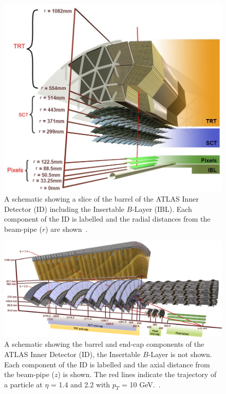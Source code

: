 \begin{figure}[!ht]
  \begin{center}
    \includegraphics[width=0.8\linewidth, angle=0]{figs/Detector/ID_slice.png}
  \end{center}
  \caption[A schematic showing a slice of the barrel of the ATLAS Inner Detector including the Insertable $B$-Layer.]
          {A schematic showing a slice of the barrel of the ATLAS Inner Detector (ID) including the Insertable $B$-Layer (IBL).
            Each component of the ID is labelled and the radial distances from the beam-pipe ($r$) are shown~\cite{obj-tracks_TIDE}.}
  \label{fig:det-ID_slice}
\end{figure}

\begin{figure}[!ht]
  \begin{center}
    \includegraphics[width=1\linewidth, angle=0]{figs/Detector/ID_schem.pdf}
  \end{center}
  \caption[A schematic showing the barrel and end-cap components of the ATLAS Inner Detector.]
          {A schematic showing the barrel and end-cap components of the ATLAS Inner Detector (ID), the Insertable $B$-Layer is not shown.
            Each component of the ID is labelled and the axial distance from the beam-pipe ($z$) is shown.
            The red lines indicate the trajectory of a particle at $\eta$ = 1.4 and 2.2 with $p_T$ = 10 GeV.~\cite{det-ATLAS_Exp}.}
  \label{fig:det-ID_schem}
\end{figure}


